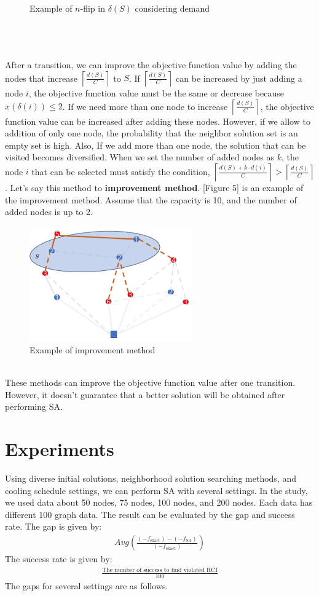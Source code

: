 \documentclass[11pt]{article}
\begin{document}
\begin{spacing}{1.5}
\begin{figure}[htb!]
    \caption{Example of $n$-flip in $\delta(S)$ considering demand}
\end{figure}
\\ \\ \\ \indent After a transition, we can improve the objective function value by adding the nodes that increase $\left\lceil\frac{d(S)}{C}\right\rceil$ to $S$. If $\left\lceil\frac{d(S)}{C}\right\rceil$ can be increased by just adding a node $i$, the objective function value must be the same or decrease because $x(\delta(i)) \le2$. If we need more than one node to increase $\left\lceil\frac{d(S)}{C}\right\rceil$, the objective function value can be increased after adding these nodes. 
However, if we allow to addition of only one node, the probability that the neighbor solution set is an empty set is high. Also, If we add more than one node, the solution that can be visited becomes diversified. When we set the number of added nodes as $k$, the node $i$ that can be selected must satisfy the condition, $\left\lceil\frac{d(S)+k\cdot d(i)}{C}\right\rceil > \left\lceil\frac{d(S)}{C}\right\rceil$. Let's say this method to \textbf{improvement method}. [Figure 5] is an example of the improvement method. Assume that the capacity is 10, and the number of added nodes is up to 2.
\begin{figure}[htb!]
    \centerline{\includegraphics[width=7cm]{image5.png}}
    \caption{Example of improvement method}
\end{figure}
\\ \indent These methods can improve the objective function value after one transition. However, it doesn't guarantee that a better solution will be obtained after performing SA. 

\newpage
{\centering\section{Experiments}}
Using diverse initial solutions, neighborhood solution searching methods, and cooling schedule settings, we can perform SA with several settings. In the study, we used data about 50 nodes, 75 nodes, 100 nodes, and 200 nodes. Each data has different 100 graph data. The result can be evaluated by the gap and success rate. The gap is given by:
\begin{align}
    Avg\left(\frac{(-f_{\text{exact}})-(-f_{\text{SA}})}{(-f_{\text{exact}})}\right)
\end{align}
The success rate is given by:
\begin{align}
    \frac{\text{The number of success to find violated RCI}}{100}
\end{align}
\indent The gaps for several settings are as follows.


\end{spacing}
\end{document}

